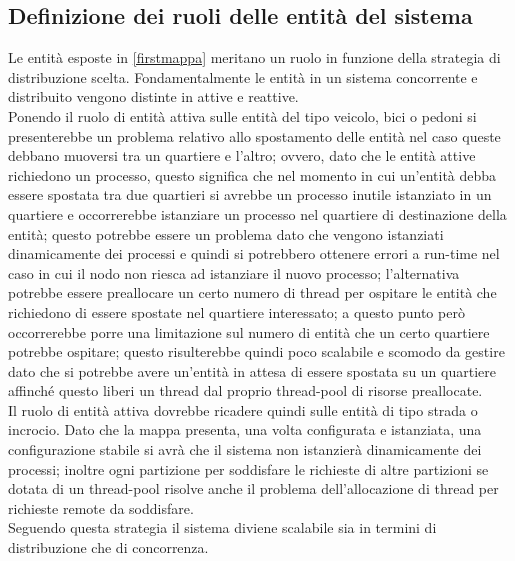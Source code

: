 \subsection{Definizione dei ruoli delle entità del sistema}
Le entità esposte in \ref{firstmappa} meritano un ruolo in funzione della strategia di distribuzione scelta. Fondamentalmente le entità in un sistema concorrente e distribuito vengono distinte in attive e reattive. \\
Ponendo il ruolo di entità attiva sulle entità del tipo veicolo, bici o pedoni
si presenterebbe un problema relativo allo spostamento delle entità nel caso
queste debbano muoversi tra un quartiere e l'altro; ovvero, dato che le entità attive richiedono un processo, questo significa che nel momento in cui un'entità debba essere spostata tra due quartieri si avrebbe un processo inutile istanziato in un quartiere e occorrerebbe istanziare un processo nel quartiere di destinazione della entità; questo potrebbe essere un problema dato che vengono istanziati dinamicamente dei processi e quindi si potrebbero ottenere errori a run-time nel caso in cui il nodo non riesca ad istanziare il nuovo processo; l'alternativa potrebbe essere preallocare un certo numero di thread per ospitare le entità che richiedono di essere spostate nel quartiere interessato; a questo punto però occorrerebbe porre una limitazione sul numero di entità che un certo quartiere potrebbe ospitare; questo risulterebbe quindi poco scalabile e scomodo da gestire dato che si potrebbe avere un'entità in attesa di essere spostata su un quartiere affinché questo liberi un thread dal proprio thread-pool di risorse preallocate. \\
Il ruolo di entità attiva dovrebbe ricadere quindi sulle entità di tipo strada o incrocio. Dato che la mappa presenta, una volta configurata e istanziata, una configurazione stabile si avrà che il sistema non istanzierà dinamicamente dei processi; inoltre ogni partizione per soddisfare le richieste di altre partizioni se dotata di un thread-pool risolve anche il problema dell'allocazione di thread per richieste remote da soddisfare.\\
Seguendo questa strategia il sistema diviene scalabile sia in termini di distribuzione che di concorrenza.


